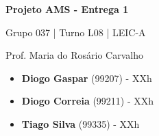 \documentclass[12pt,a4paper]{article}
\begin{document}
\begin{titlepage}
  \begin{center}
    \vspace*{5cm}

    \Huge
    \textbf{Projeto AMS - Entrega 1}

    \vspace{0.5cm}
    \LARGE
    Grupo 037 | Turno L08 | LEIC-A

    \vspace{0.5cm}
    \large
    Prof. Maria do Rosário Carvalho

    \vfill
  \end{center}
  \large
  \begin{itemize}
    \item[] \textbf{Diogo Gaspar} (99207) - XXh
    \item[] \textbf{Diogo Correia} (99211) - XXh
    \item[] \textbf{Tiago Silva} (99335) - XXh
  \end{itemize}
\end{titlepage}

\begin{landscape}
  \begin{center}
    
  \end{center}
\end{landscape}

\begin{landscape}
  \begin{center}
    
  \end{center}
\end{landscape}

\begin{landscape}
  \begin{center}
    
  \end{center}
\end{landscape}
\end{document}
